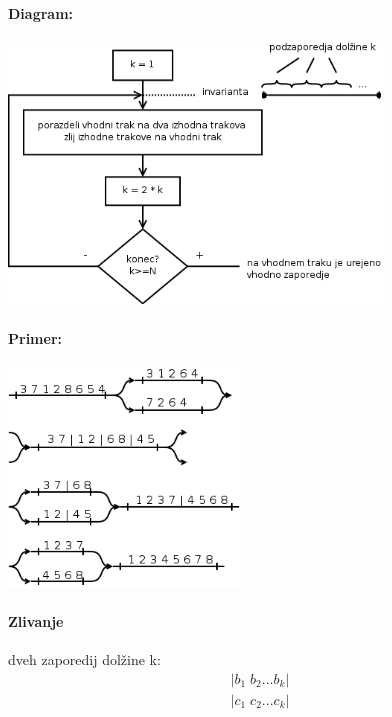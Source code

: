 \documentclass[a4paper,10pt]{article}
\begin{document}
\paragraph{Diagram:}
\begin{center}
	\includegraphics[width=9.95cm,height=6.95cm]{Slike/NavadnoZlivanjeDiagram.png}
\end{center}

\paragraph{Primer:}
	\begin{center}
	\includegraphics[width=6.15cm,height=5.85cm]{Slike/NavadnoZlivanjePrimer.png}
	\end{center}

\paragraph{Zlivanje}
dveh zaporedij dol\v zine k:
$$
\begin{array}{l}
\vert b_1 \; b_2 ... b_k \vert \\
\vert c_1 \; c_2 ... c_k \vert
\end{array}
$$
\end{document}

